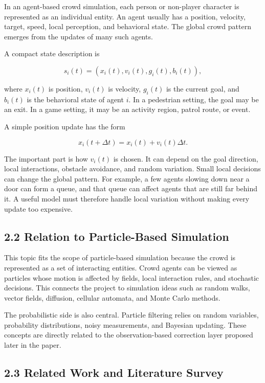 \documentclass[
  11pt,
]{article}
\begin{document}
In an agent-based crowd simulation, each person or non-player character
is represented as an individual entity. An agent usually has a position,
velocity, target, speed, local perception, and behavioral state. The
global crowd pattern emerges from the updates of many such agents.

A compact state description is

\[
s_i(t) = \left(x_i(t), v_i(t), g_i(t), b_i(t)\right),
\]

where \(x_i(t)\) is position, \(v_i(t)\) is velocity, \(g_i(t)\) is the
current goal, and \(b_i(t)\) is the behavioral state of agent \(i\). In
a pedestrian setting, the goal may be an exit. In a game setting, it may
be an activity region, patrol route, or event.

A simple position update has the form

\[
x_i(t+\Delta t) = x_i(t) + v_i(t)\Delta t.
\]

The important part is how \(v_i(t)\) is chosen. It can depend on the
goal direction, local interactions, obstacle avoidance, and random
variation. Small local decisions can change the global pattern. For
example, a few agents slowing down near a door can form a queue, and
that queue can affect agents that are still far behind it. A useful
model must therefore handle local variation without making every update
too expensive.

\subsection{2.2 Relation to Particle-Based
Simulation}\label{relation-to-particle-based-simulation}

This topic fits the scope of particle-based simulation because the crowd
is represented as a set of interacting entities. Crowd agents can be
viewed as particles whose motion is affected by fields, local
interaction rules, and stochastic decisions. This connects the project
to simulation ideas such as random walks, vector fields, diffusion,
cellular automata, and Monte Carlo methods.

The probabilistic side is also central. Particle filtering relies on
random variables, probability distributions, noisy measurements, and
Bayesian updating. These concepts are directly related to the
observation-based correction layer proposed later in the paper.

\subsection{2.3 Related Work and Literature
Survey}\label{related-work-and-literature-survey}
\end{document}
